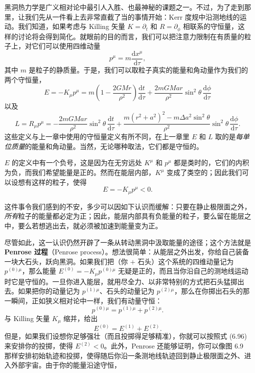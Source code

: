 黑洞热力学是广义相对论中最引人入胜、也最神秘的课题之一。不过，为了走到那里，让我们先从一件看上去非常直截了当的事情开始：Kerr 度规中沿测地线的运动。我们知道，如果考虑与 Killing 矢量 $K=\partial_t$ 和 $R=\partial_\phi$ 相联系的守恒量，这样的讨论将会得到简化。就眼前的目的而言，我们可以把注意力限制在有质量的粒子上，对它们可以使用四维动量
\begin{equation*}
p^{\mu} = m\frac{\mathrm{d}x^{\mu}}{\mathrm{d}\tau},
\tag{6.93}
\end{equation*}
其中 $m$ 是粒子的静质量。于是，我们可以取粒子真实的能量和角动量作为我们的两个守恒量，
\begin{equation*}
E = -K_{\mu}p^{\mu} = m\left(1-\frac{2GMr}{\rho^{2}}\right)\frac{\mathrm{d}t}{\mathrm{d}\tau} + \frac{2mGMar}{\rho^{2}}\sin^{2}\theta\,\frac{\mathrm{d}\phi}{\mathrm{d}\tau}
\tag{6.94}
\end{equation*}
以及
\begin{equation*}
L = R_{\mu}p^{\mu} = -\frac{2mGMar}{\rho^{2}}\sin^{2}\theta\,\frac{\mathrm{d}t}{\mathrm{d}\tau} + \frac{m(r^{2}+a^{2})^{2}-m\Delta a^{2}\sin^{2}\theta}{\rho^{2}}\sin^{2}\theta\,\frac{\mathrm{d}\phi}{\mathrm{d}\tau}.
\tag{6.95}
\end{equation*}
这些定义与上一章中使用的守恒量定义有所不同，在上一章里 $E$ 和 $L$ 取的是\emph{每单位质量}的能量和角动量。当然，无论哪种取法，它们都是守恒的。

$E$ 的定义中有一个负号，这是因为在无穷远处 $K^{\mu}$ 和 $p^{\mu}$ 都是类时的，它们的内积为负，而我们希望能量是正的。然而在能层内部，$K^{\mu}$ 变成了类空的；因此我们可以设想有这样的粒子，使得
\begin{equation*}
E = -K_{\mu}p^{\mu} < 0.
\tag{6.96}
\end{equation*}


这件事令我们感到的不安，多少可以因如下认识而缓解：只要在静止极限面之外，\emph{所有}粒子的能量都必定为正；因此，能层内部具有负能量的粒子，要么留在能层之中，要么若想逃出去，就必须被加速到能量变为正。

尽管如此，这一认识仍然开辟了一条从转动黑洞中汲取能量的途径；这个方法就是\textbf{Penrose 过程}（Penrose process）。想法很简单：从能层之外出发，你给自己装备一块大石头，跃向黑洞。如果我们把（你 $+$ 石头）这个系统的四维动量记为 $p^{(0)\mu}$，那么能量 $E^{(0)}=-K_{\mu}p^{(0)\mu}$ 无疑是正的，而且当你沿自己的测地线运动时它是守恒的。一旦你进入能层，就用尽全力、以非常特别的方式把石头猛掷出去。如果把你的动量记为 $p^{(1)\mu}$、石头的动量记为 $p^{(2)\mu}$，那么在你掷出石头的那一瞬间，正如狭义相对论中一样，我们有动量守恒：
\begin{equation*}
p^{(0)\mu} = p^{(1)\mu} + p^{(2)\mu}.
\tag{6.97}
\end{equation*}
与 Killing 矢量 $K_{\mu}$ 缩并，给出
\begin{equation*}
E^{(0)} = E^{(1)} + E^{(2)}.
\tag{6.98}
\end{equation*}
但是，如果我们设想你足够强壮（而且投掷得足够精准），你就可以按照式 (6.96) 来安排你的投掷，使得 $E^{(2)}<0$。此外，Penrose 还能够证明，你可以像图 6.9 那样安排初始轨迹和投掷，使得随后你沿一条测地线轨迹回到静止极限面之外、进入外部宇宙。由于你的能量沿途守恒，

